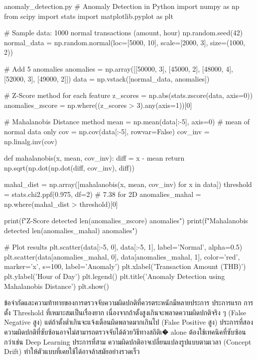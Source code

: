 \begin{pycode}{anomaly\_detection.py}
# Anomaly Detection in Python
import numpy as np
from scipy import stats
import matplotlib.pyplot as plt

# Sample data: 1000 normal transactions (amount, hour)
np.random.seed(42)
normal_data = np.random.normal(loc=[5000, 10], scale=[2000, 3], size=(1000, 2))

# Add 5 anomalies
anomalies = np.array([[50000, 3], [45000, 2], [48000, 4], [52000, 3], [49000, 2]])
data = np.vstack([normal_data, anomalies])

# Z-Score method for each feature
z_scores = np.abs(stats.zscore(data, axis=0))
anomalies_zscore = np.where((z_scores > 3).any(axis=1))[0]

# Mahalanobis Distance method
mean = np.mean(data[:-5], axis=0)  # mean of normal data only
cov = np.cov(data[:-5], rowvar=False)
cov_inv = np.linalg.inv(cov)

def mahalanobis(x, mean, cov_inv):
    diff = x - mean
    return np.sqrt(np.dot(np.dot(diff, cov_inv), diff))

mahal_dist = np.array([mahalanobis(x, mean, cov_inv) for x in data])
threshold = stats.chi2.ppf(0.975, df=2)  # 7.38 for 2D
anomalies_mahal = np.where(mahal_dist > threshold)[0]

print(f"Z-Score detected {len(anomalies_zscore)} anomalies")
print(f"Mahalanobis detected {len(anomalies_mahal)} anomalies")

# Plot results
plt.scatter(data[:-5, 0], data[:-5, 1], label='Normal', alpha=0.5)
plt.scatter(data[anomalies_mahal, 0], data[anomalies_mahal, 1], 
            color='red', marker='x', s=100, label='Anomaly')
plt.xlabel('Transaction Amount (THB)')
plt.ylabel('Hour of Day')
plt.legend()
plt.title('Anomaly Detection using Mahalanobis Distance')
plt.show()
\end{pycode}

ข้อจำกัดและความท้าทายของการตรวจจับความผิดปกติที่ควรตระหนักมีหลายประการ ประการแรก การตั้ง Threshold ที่เหมาะสมเป็นเรื่องยาก เนื่องจากถ้าตั้งสูงเกินจะพลาดความผิดปกติจริง ๆ (False Negative สูง) แต่ถ้าตั้งต่ำเกินจะแจ้งเตือนผิดพลาดมากเกินไป (False Positive สูง) ประการที่สอง ความผิดปกติที่ซับซ้อนอาจไม่สามารถตรวจจับได้ด้วยวิธีทางสถิติเ� alone ต้องใช้เทคนิคที่ซับซ้อนกว่าเช่น Deep Learning ประการที่สาม ความผิดปกติอาจเปลี่ยนแปลงรูปแบบตามเวลา (Concept Drift) ทำให้ตัวแบบที่เคยใช้ได้อาจล้าสมัยอย่างรวดเร็ว

\newpage
